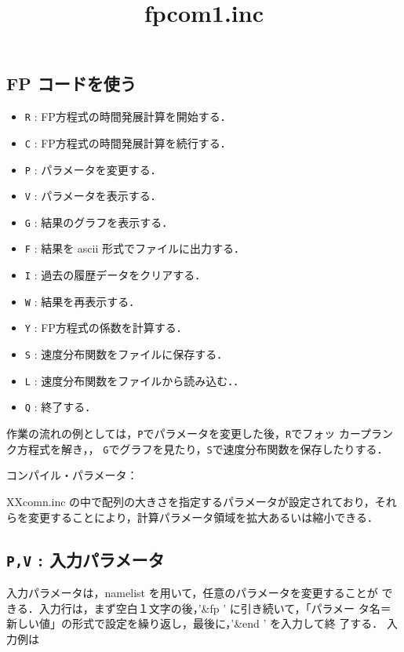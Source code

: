 \documentclass[11pt]{jarticle}
\begin{document}
\subsection{FP コードを使う}
\begin{itemize}
 \item[] {\tt R} : FP方程式の時間発展計算を開始する．
 \item[] {\tt C} : FP方程式の時間発展計算を続行する．
 \item[] {\tt P} : パラメータを変更する．
 \item[] {\tt V} : パラメータを表示する．
 \item[] {\tt G} : 結果のグラフを表示する．
 \item[] {\tt F} : 結果を ascii 形式でファイルに出力する．
 \item[] {\tt I} : 過去の履歴データをクリアする．
 \item[] {\tt W} : 結果を再表示する．
 \item[] {\tt Y} : FP方程式の係数を計算する．
 \item[] {\tt S} : 速度分布関数をファイルに保存する．
 \item[] {\tt L} : 速度分布関数をファイルから読み込む．．
 \item[] {\tt Q} : 終了する．
\end{itemize}
作業の流れの例としては，{\tt P}でパラメータを変更した後，{\tt R}でフォッ
カープランク方程式を解き，，
{\tt G}でグラフを見たり，{\tt S}で速度分布関数を保存したりする．

コンパイル・パラメータ：

XXcomn.inc の中で配列の大きさを指定するパラメータが設定されており，それ
らを変更することにより，計算パラメータ領域を拡大あるいは縮小できる．

\title{fpcom1.inc}
\begin{tabbing}
\compileParmLine
{}
\end{tabbing}

\subsection{{\tt P,V} :  入力パラメータ}
入力パラメータは，namelist を用いて，任意のパラメータを変更することが
できる．入力行は，まず空白１文字の後，'\&fp ' に引き続いて，「パラメー
タ名＝新しい値」の形式で設定を繰り返し，最後に，'\&end ' を入力して終
了する．
入力例は
\\
\end{document}
